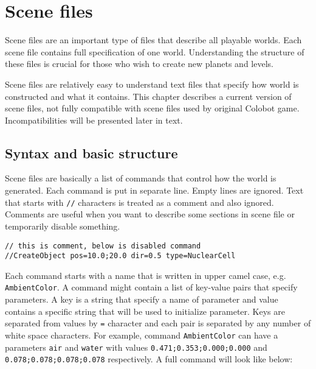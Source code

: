 
\section{Scene files}

Scene files are an important type of files that describe all playable worlds. Each scene file contains full specification of one world. Understanding the structure of these files is crucial for those who wish to create new planets and levels.

Scene files are relatively easy to understand text files that specify how world is constructed and what it contains. This chapter describes a current version of scene files, not fully compatible with scene files used by original Colobot game. Incompatibilities will be presented later in text.


\subsection{Syntax and basic structure}


Scene files are basically a list of commands that control how the world is generated. Each command is put in separate line. Empty lines are ignored. Text that starts with \texttt{//} characters is treated as a comment and also ignored. Comments are useful when you want to describe some sections in scene file or temporarily disable something.

\begin{lstlisting}[style=scene]
// this is comment, below is disabled command
//CreateObject pos=10.0;20.0 dir=0.5 type=NuclearCell
\end{lstlisting}

Each command starts with a name that is written in upper camel case, e.g. \texttt{AmbientColor}. A command might contain a list of key-value pairs that specify parameters. A key is a string that specify a name of parameter and value contains a specific string that will be used to initialize parameter. Keys are separated from values by \texttt{=} character and each pair is separated by any number of white space characters. For example, command \texttt{AmbientColor} can have a parameters \texttt{air} and \texttt{water} with values \texttt{0.471;0.353;0.000;0.000} and \texttt{0.078;0.078;0.078;0.078} respectively. A full command will look like below:

